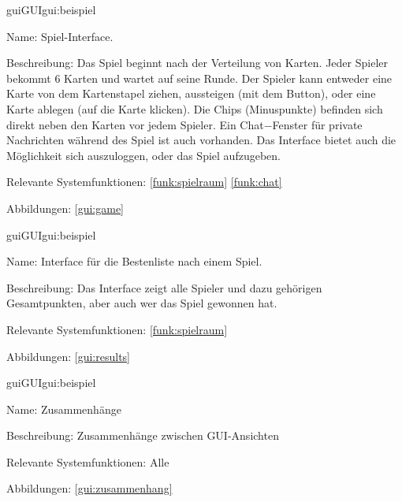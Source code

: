\begin{description}[leftmargin=5em, style=sameline]	
	\begin{lhp}{gui}{GUI}{gui:beispiel}
		\item[Name:] Spiel-Interface.
		\item[Beschreibung:] Das Spiel beginnt nach der Verteilung von Karten. Jeder Spieler bekommt 6 Karten und wartet auf seine Runde. Der Spieler kann entweder eine Karte von dem Kartenstapel ziehen, aussteigen (mit dem Button), oder eine Karte ablegen (auf die Karte klicken). Die Chips (Minuspunkte) befinden sich direkt neben den Karten vor jedem Spieler. Ein Chat$-$Fenster für private Nachrichten während des Spiel ist auch vorhanden. Das Interface bietet auch die Möglichkeit sich auszuloggen, oder das Spiel aufzugeben.
		\item[Relevante Systemfunktionen:] \ref{funk:spielraum} \ref{funk:chat}
		\item[Abbildungen:] \ref{gui:game}
	\end{lhp}
\end{description}
\begin{description}[leftmargin=5em, style=sameline]	
	\begin{lhp}{gui}{GUI}{gui:beispiel}
		\item[Name:] Interface für die Bestenliste nach einem Spiel.
		\item[Beschreibung:] Das Interface zeigt alle Spieler und dazu gehörigen Gesamtpunkten, aber auch wer das Spiel gewonnen hat.
		\item[Relevante Systemfunktionen:]\ref{funk:spielraum}
		\item[Abbildungen:] \ref{gui:results}
	\end{lhp}
\end{description}
\begin{description}[leftmargin=5em, style=sameline]	
	\begin{lhp}{gui}{GUI}{gui:beispiel}
		\item[Name:] Zusammenhänge
		\item[Beschreibung:] Zusammenhänge zwischen GUI-Ansichten
		\item[Relevante Systemfunktionen:] Alle
		\item[Abbildungen:] \ref{gui:zusammenhang}
	\end{lhp}
\end{description}



